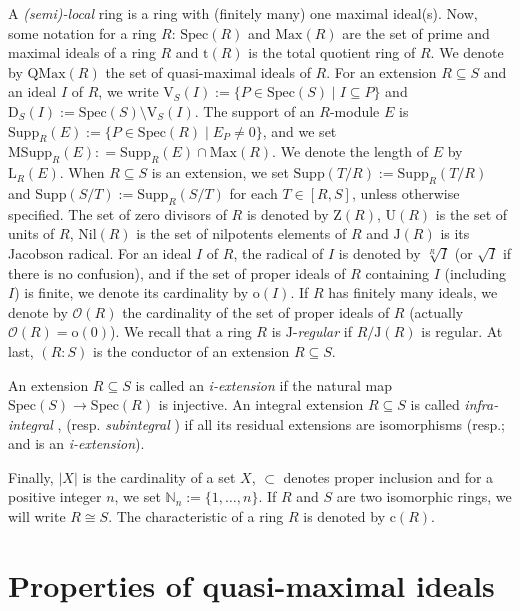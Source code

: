 \documentclass[12pt,leqno]{amsart}
\theoremstyle{definition}
\begin{document}
A {\it (semi)-local} ring is a ring with (finitely many) one maximal ideal(s). Now, some notation for a ring $R$: $\mathrm{Spec}(R)$ and $\mathrm {Max}(R)$ are the set of prime and maximal ideals of a ring $R$ and $\mathrm{t}(R)$ is the total quotient ring of $R$. We denote by $\mathrm {QMax}(R)$ the set of quasi-maximal ideals of $R$. For an extension $R\subseteq S$ and an ideal $I$ of $R$, we write $\mathrm{V}_S(I):=\{P\in\mathrm{Spec}(S)\mid I\subseteq P\}$ and $\mathrm{D}_S(I):=\mathrm {Spec}(S)\setminus\mathrm{V}_S(I)$. The support of an $R$-module $E$ is $\mathrm{Supp}_R(E):=\{P\in\mathrm{Spec}(R)\mid E_P\neq 0\}$, and we set $\mathrm{MSupp}_R(E): =\mathrm{Supp}_R(E)\cap\mathrm{Max}(R)$. We denote the length of $E$ by $\mathrm{L}_R(E)$. When $R\subseteq S$ is an extension, we set $\mathrm{Supp}(T/R):=\mathrm {Supp}_R(T/R)$ and $\mathrm{Supp}(S/T):=\mathrm{Supp}_R(S/T)$ for each $T\in[R,S]$, unless otherwise specified. The set of zero divisors of $ R$ is denoted by $\mathrm Z(R)$, $\mathrm{U}(R)$ is the set of units of $ R$, $\mathrm{Nil}(R)$ is the set of nilpotents elements of $R$ and $\mathrm J(R)$ is its Jacobson radical. For an ideal $ I$ of $R$, the radical of $I$ is denoted by $\sqrt[R]I$ (or $\sqrt I$ if there is no confusion), and if the set of proper ideals of $R$ containing $I$ (including $I$) is finite, we denote its cardinality by $\mathrm o(I)$. If $R$ has finitely many ideals, we denote by $\mathcal O(R)$ the cardinality of the set of proper ideals of $R$ (actually $\mathcal O(R)=\mathrm o(0)$). We recall that a ring $R$ is $\mathrm J$-{\it regular} if $R/\mathrm J(R)$ is regular. At last, $(R:S)$ is the conductor of an extension $R\subseteq S$. 

An extension $R\subseteq S$ is called an {\it i-extension} if the natural map $\mathrm{Spec}(S)\to\mathrm{Spec}(R)$ is injective. An integral extension $R\subseteq S$ is called {\it infra-integral} \cite{Pic 2}, (resp. {\it subintegral} \cite{S}) if all its residual extensions are isomorphisms (resp$.$; and is an {\it i-extension}).

Finally, $|X|$ is the cardinality of a set $X$, $\subset$ denotes proper inclusion and for a positive integer $n$, we set $\mathbb{N}_n:=\{1,\ldots,n \}$. If $R$ and $S$ are two isomorphic rings, we will write $R\cong S$. The characteristic of a ring $R$ is denoted by $\mathrm{c}(R)$.
  
  \section{Properties of quasi-maximal ideals}
  
\end{document}
